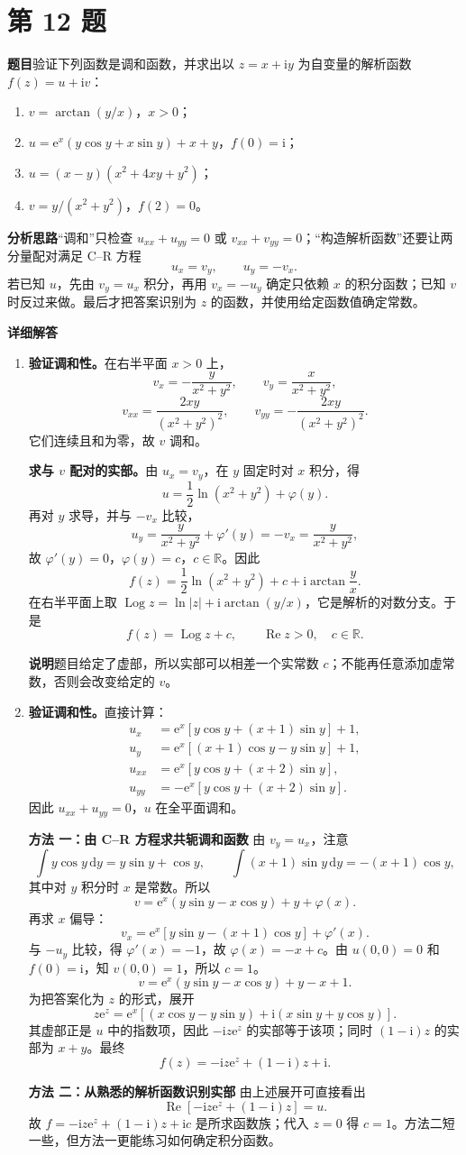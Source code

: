 \documentclass[UTF8,11pt,a4paper,fontset=fandol]{ctexart}
\newcommand{\ii}{\mathrm{i}}
\newcommand{\ee}{\mathrm{e}}
\newcommand{\dd}{\,\mathrm{d}}
\newcommand{\Ree}{\operatorname{Re}}
\newcommand{\Log}{\operatorname{Log}}
\newcommand{\idea}{\par\medskip\Needspace{3\baselineskip}\noindent\textbf{分析思路}\quad}
\newcommand{\answer}{\par\medskip\Needspace{3\baselineskip}\noindent\textbf{详细解答}\quad}
\newcommand{\method}[1]{\par\medskip\Needspace{3\baselineskip}\noindent\textbf{方法 #1}\quad}
\newcommand{\note}{\par\medskip\Needspace{3\baselineskip}\noindent\textbf{说明}\quad}
\newcommand{\problem}[1]{\par\Needspace{8\baselineskip}\section*{第 #1 题}\addcontentsline{toc}{section}{第 #1 题}}
\begin{document}
\problem{12}
\textbf{题目}\quad 验证下列函数是调和函数，并求出以 $z=x+\ii y$ 为自变量的解析函数 $f(z)=u+\ii v$：
\begin{enumerate}
\item $v=\arctan(y/x)$，$x>0$；
\item $u=\ee^x(y\cos y+x\sin y)+x+y$，$f(0)=\ii$；
\item $u=(x-y)(x^2+4xy+y^2)$；
\item $v=y/(x^2+y^2)$，$f(2)=0$。
\end{enumerate}
\idea “调和”只检查 $u_{xx}+u_{yy}=0$ 或 $v_{xx}+v_{yy}=0$；“构造解析函数”还要让两分量配对满足 C--R 方程
\[
u_x=v_y,\qquad u_y=-v_x.
\]
若已知 $u$，先由 $v_y=u_x$ 积分，再用 $v_x=-u_y$ 确定只依赖 $x$ 的积分函数；已知 $v$ 时反过来做。最后才把答案识别为 $z$ 的函数，并使用给定函数值确定常数。
\answer
\begin{enumerate}
\item \textbf{验证调和性。}在右半平面 $x>0$ 上，
\[
v_x=-\frac{y}{x^2+y^2},\qquad v_y=\frac{x}{x^2+y^2},
\]
\[
v_{xx}=\frac{2xy}{(x^2+y^2)^2},\qquad
v_{yy}=-\frac{2xy}{(x^2+y^2)^2}.
\]
它们连续且和为零，故 $v$ 调和。

\textbf{求与 $v$ 配对的实部。}由 $u_x=v_y$，在 $y$ 固定时对 $x$ 积分，得
\[
u=\frac12\ln(x^2+y^2)+\varphi(y).
\]
再对 $y$ 求导，并与 $-v_x$ 比较，
\[
u_y=\frac{y}{x^2+y^2}+\varphi'(y)
=-v_x=\frac{y}{x^2+y^2},
\]
故 $\varphi'(y)=0$，$\varphi(y)=c$，$c\in\mathbb R$。因此
\[
f(z)=\frac12\ln(x^2+y^2)+c+\ii\arctan\frac yx.
\]
在右半平面上取 $\Log z=\ln|z|+\ii\arctan(y/x)$，它是解析的对数分支。于是
\[
f(z)=\Log z+c,\qquad \Ree z>0,\quad c\in\mathbb R.
\]
\note 题目给定了虚部，所以实部可以相差一个实常数 $c$；不能再任意添加虚常数，否则会改变给定的 $v$。

\item \textbf{验证调和性。}直接计算：
\begin{align*}
u_x&=\ee^x[y\cos y+(x+1)\sin y]+1,\\
u_y&=\ee^x[(x+1)\cos y-y\sin y]+1,\\
u_{xx}&=\ee^x[y\cos y+(x+2)\sin y],\\
u_{yy}&=-\ee^x[y\cos y+(x+2)\sin y].
\end{align*}
因此 $u_{xx}+u_{yy}=0$，$u$ 在全平面调和。

\method{一：由 C--R 方程求共轭调和函数}
由 $v_y=u_x$，注意
\[
\int y\cos y\dd y=y\sin y+\cos y,\qquad
\int(x+1)\sin y\dd y=-(x+1)\cos y,
\]
其中对 $y$ 积分时 $x$ 是常数。所以
\[
v=\ee^x(y\sin y-x\cos y)+y+\varphi(x).
\]
再求 $x$ 偏导：
\[
v_x=\ee^x[y\sin y-(x+1)\cos y]+\varphi'(x).
\]
与 $-u_y$ 比较，得 $\varphi'(x)=-1$，故 $\varphi(x)=-x+c$。由 $u(0,0)=0$ 和 $f(0)=\ii$，知 $v(0,0)=1$，所以 $c=1$。
\[
v=\ee^x(y\sin y-x\cos y)+y-x+1.
\]
为把答案化为 $z$ 的形式，展开
\[
z\ee^z=\ee^x[(x\cos y-y\sin y)+\ii(x\sin y+y\cos y)].
\]
其虚部正是 $u$ 中的指数项，因此 $-\ii z\ee^z$ 的实部等于该项；同时 $(1-\ii)z$ 的实部为 $x+y$。最终
\[
f(z)=-\ii z\ee^z+(1-\ii)z+\ii.
\]
\method{二：从熟悉的解析函数识别实部}
由上述展开可直接看出
\[
\Ree[-\ii z\ee^z+(1-\ii)z]=u.
\]
故 $f=-\ii z\ee^z+(1-\ii)z+\ii c$ 是所求函数族；代入 $z=0$ 得 $c=1$。方法二短一些，但方法一更能练习如何确定积分函数。


\end{enumerate}
\end{document}
